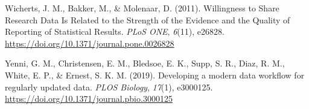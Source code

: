 \begin{CSLReferences}{1}{0}
\leavevmode{}%
Wicherts, J. M., Bakker, M., \& Molenaar, D. (2011). Willingness to Share Research Data Is Related to the Strength of the Evidence and the Quality of Reporting of Statistical Results. \emph{PLoS ONE}, \emph{6}(11), e26828. \url{https://doi.org/10.1371/journal.pone.0026828}

\leavevmode{}%
Yenni, G. M., Christensen, E. M., Bledsoe, E. K., Supp, S. R., Diaz, R. M., White, E. P., \& Ernest, S. K. M. (2019). Developing a modern data workflow for regularly updated data. \emph{PLOS Biology}, \emph{17}(1), e3000125. \url{https://doi.org/10.1371/journal.pbio.3000125}

\end{CSLReferences}
